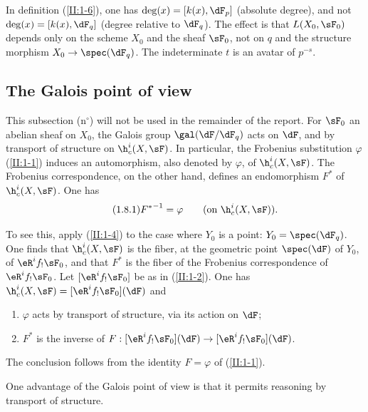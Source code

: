 In definition (\ref{II:1-6}), one has $\deg(x)=[k(x),\dF_p]$ (absolute
degree), and not $\deg(x)=[k(x),\dF_q]$ (degree relative to $\dF_q$). The
effect is that $L(X_0,\sF_0)$ depends only on the scheme $X_0$ and the sheaf
$\sF_0$, not on $q$ and the structure morphism
$X_0\to\spec(\dF_q)$. The indeterminate $t$ is an avatar of $p^{-s}$.






\subsection{The Galois point of view}\label{II:1-8}

This subsection (n$^\circ$) will not be used in the remainder of the report. For $\sF_0$
an abelian sheaf on $X_0$, the Galois group $\gal(\dF/\dF_q)$ acts on
$\dF$, and by transport of structure on $\h_c^i(X,\sF)$. In particular, the
Frobenius substitution $\varphi$ (\ref{II:1-1}) induces an automorphism, also
denoted by $\varphi$, of $\h_c^i(X,\sF)$. The Frobenius correspondence, on the
other hand, defines an endomorphism $F^*$ of $\h_c^i(X,\sF)$. One has
\begin{equation*}\tag{1.8.1}\label{II:eq:1-8-1}
  {F^*}^{-1} = \varphi \qquad \text{(on $\h_c^i(X,\sF)$).}
\end{equation*}

To see this, apply (\ref{II:1-4}) to the case where $Y_0$ is a point:
$Y_0=\spec(\dF_q)$. One finds that $\h_c^i(X,\sF)$ is the fiber, at the
geometric point $\spec(\dF)$ of $Y_0$, of $\eR^i f_! \sF_0$, and that $F^*$
is the fiber of the Frobenius correspondence of $\eR^i f_!\sF_0$. Let
$[\eR^i f_! \sF_0]$ be as in (\ref{II:1-2}). One has
$\h_c^i(X,\sF) = [\eR^i f_!\sF_0](\dF)$ and
\begin{enumerate}[\indent a)]
  \item $\varphi$ acts by transport of structure, via its action on $\dF$;
  \item {}$F^*$ is the inverse of
    $F:[\eR^i f_!\sF_0](\dF) \to [\eR^i f_!\sF_0](\dF)$.
\end{enumerate}

The conclusion follows from the identity $F=\varphi$ of (\ref{II:1-1}).

One advantage of the Galois point of view is that it permits reasoning by
transport of structure.










